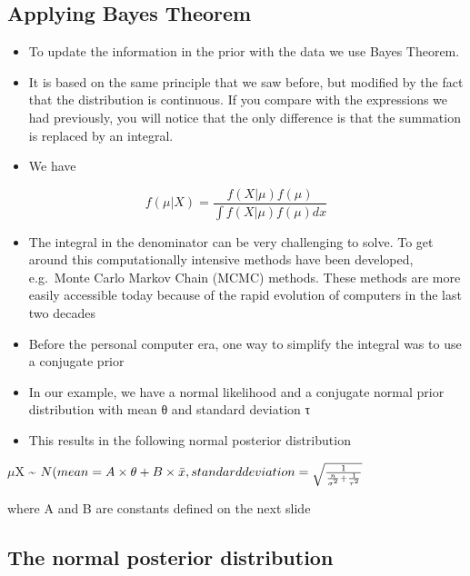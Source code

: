 \documentclass[
]{book}
\providecommand{\tightlist}{%
  \setlength{\itemsep}{0pt}\setlength{\parskip}{0pt}}
\begin{document}
\hypertarget{applying-bayes-theorem}{%
\subsection{Applying Bayes Theorem}\label{applying-bayes-theorem}}

\begin{itemize}
\tightlist
\item
  To update the information in the prior with the data we use Bayes Theorem.
\item
  It is based on the same principle that we saw before, but modified by the fact that the distribution is continuous. If you compare with the expressions we had previously, you will notice that the only difference is that the summation is replaced by an integral.
\item
  We have
\end{itemize}

\[f(\mu|X)=\frac{f(X|\mu)f(\mu)}{\int f(X|\mu)f(\mu)dx}\]

\begin{itemize}
\tightlist
\item
  The integral in the denominator can be very challenging to solve. To get around this computationally intensive methods have been developed, e.g.~Monte Carlo Markov Chain (MCMC) methods. These methods are more easily accessible today because of the rapid evolution of computers in the last two decades
\item
  Before the personal computer era, one way to simplify the integral was to use a conjugate prior
\item
  In our example, we have a normal likelihood and a conjugate normal prior distribution with mean θ and standard deviation τ
\item
  This results in the following normal posterior distribution
\end{itemize}

\(\mu\)\textbar X \textasciitilde{} \(N(mean=A\times\theta+B\times\bar x,standard\space deviation=\sqrt{\frac{1}{\frac{n}{\sigma^2}+\frac{1}{\tau^2}}}\)

where A and B are constants defined on the next slide

\hypertarget{the-normal-posterior-distribution}{%
\subsection{The normal posterior distribution}\label{the-normal-posterior-distribution}}
\end{document}
